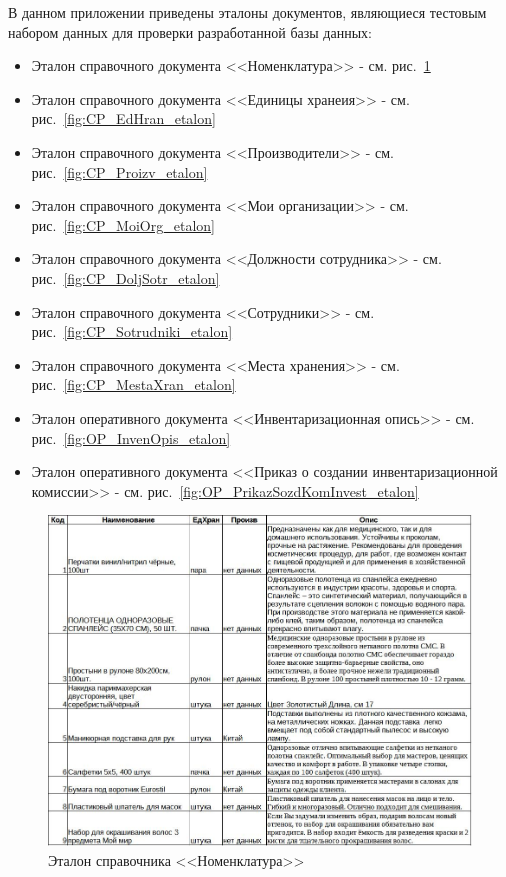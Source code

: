 \thispagestyle{plain}
\pagestyle{plain}
\hspace{0pt}

В данном приложении приведены эталоны документов,
являющиеся тестовым набором данных для проверки разработанной базы данных:

\begin{itemize}
    \item Эталон справочного документа <<Номенклатура>> - см. рис.~\ref{fig:CP_Nomenclatura_etalon}
    \item Эталон справочного документа <<Единицы хранеия>> - см. рис.~\ref{fig:CP_EdHran_etalon}
    \item Эталон справочного документа <<Производители>> - см. рис.~\ref{fig:CP_Proizv_etalon}
    \item Эталон справочного документа <<Мои организации>> - см. рис.~\ref{fig:CP_MoiOrg_etalon}
    \item Эталон справочного документа <<Должности сотрудника>> - см. рис.~\ref{fig:CP_DoljSotr_etalon}
    \item Эталон справочного документа <<Сотрудники>> - см. рис.~\ref{fig:CP_Sotrudniki_etalon}
    \item Эталон справочного документа <<Места хранения>> - см. рис.~\ref{fig:CP_MestaXran_etalon}
    \item Эталон оперативного документа <<Инвентаризационная опись>> - см. рис.~\ref{fig:OP_InvenOpis_etalon}
    \item Эталон оперативного документа <<Приказ о создании инвентаризационной комиссии>> - см. рис.~\ref{fig:OP_PrikazSozdKomInvest_etalon}
\end{itemize}

\begin{figure}[!h]
    \centering
    \includegraphics[width=18cm]
        {_docs/СП_Номенкл_эталон.jpg}
    \caption{Эталон справочника <<Номенклатура>>}
    \label{fig:CP_Nomenclatura_etalon}
\end{figure}


